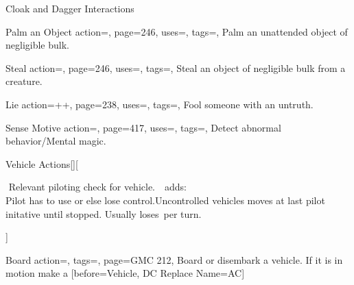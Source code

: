\begin{PageBack}
\begin{Tables}{\backTableHeight}
\begin{Table}{Cloak and Dagger Interactions}
\begin{entry}{Palm an Object}{%
                action=,
                page=246,
                uses=\Thievery,
                tags=\Manipulate,
            }
                Palm an unattended object of negligible bulk.\hfill{}
            \end{entry}
            \begin{entry}{Steal}{%
                action=,
                page=246,
                uses=\Thievery,
                tags=\Manipulate,
            }
                Steal an object of negligible bulk from a creature.\hfill {}
            \end{entry}
            \breakLine
            \begin{entry}{Lie}{%
                action=++,
                page=238,
                uses={\Deception[tags={S}]},
                tags=\Mental\Concentrate,
            }
                Fool someone with an untruth. \Auditory\,\Linguistic \hfill{}
            \end{entry}
            \begin{entry}{Sense Motive}{%
                action=,
                page=417,
                uses={\Perception[tags={S}]},
                tags=\Concentrate,
            }
                Detect abnormal behavior/Mental magic. \hfill{}\;
            \end{entry}
        \end{Table}
        \TableSpace
        \begin{Table}{Vehicle Actions}[][%
            \begin{minipage}[b]{0.755\linewidth}%
                \Piloting\,\dash\,Relevant piloting check for vehicle. \hfill \Reck \,\dash\,  adds: \textbf{}\\
                Pilot has to use  or  else lose control.\hfill Uncontrolled vehicles moves
                at last pilot
                initative until stopped. Usually loses \,\Feet per turn.%
            \end{minipage}%
        ]
            \begin{entry}{Board}{%
                action=,
                tags=\Move,
                page=GMC 212,
            }
                Board or disembark a vehicle. \hfill If it is in motion make a
                [before=Vehicle, DC Replace Name=AC]

\end{entry}
\end{Table}
\end{Tables}
\end{PageBack}
